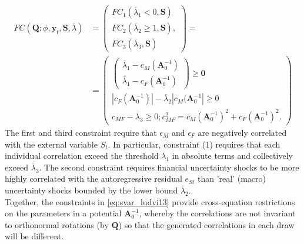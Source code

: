 \documentclass[a4paper,11pt,listof=nochaptergap,oneside,pointednumbers,bibtotoc,bigheadings,liststotoc]{scrbook}
\theoremstyle{mysatz}
\theoremstyle{mydefinition}
\theoremstyle{mybemerkung}
\newcommand{\vect}[1]{\boldsymbol{\mathbf{#1}}}
\begin{document}
\begin{equation} \label{eq:svar_ludvi13}
\begin{split}
	FC(\vect{Q}; \phi, \vect{y}_t, \vect{S}, \overline{\lambda}) & = \begin{pmatrix}
	FC_1(\overline{\lambda}_1 < 0, \vect{S})\\
	 FC_2(\overline{\lambda}_2 \geq 1, \vect{S}), \\
	 FC_3(\overline{\lambda}_3, \vect{S})
	\end{pmatrix} = \\
	& = \begin{pmatrix}
	 		\begin{pmatrix}
	 			\overline{\lambda}_1 - c_M(\vect{A}_0^{-1})\\
				\overline{\lambda}_1 - c_F(\vect{A}_0^{-1})
			\end{pmatrix} \geq \vect{0} \\
			|c_F(\vect{A}_0^{-1})| - \overline{\lambda}_2|c_M(\vect{A}_0^{-1}| \geq 0 \\
			c_{MF} - \overline{\lambda}_3 \geq 0; c_{MF}^2 = c_M(\vect{A}_0^{-1})^2 + c_F(\vect{A}_0^{-1})^2.
	\end{pmatrix} 
\end{split}								
\end{equation}
The first and third constraint require that $\epsilon_M$ and $\epsilon_F$ are negatively correlated with the external variable $S_t$. In particular, constraint (1) requires that each individual correlation exceed the threshold $\overline{\lambda}_1$ in absolute terms and collectively exceed $\overline{\lambda}_3$. The second constraint requires financial uncertainty shocks to be more highly correlated with the autoregressive residual $e_{St}$ than 'real' (macro) uncertainty shocks bounded by the lower bound $\overline{\lambda}_2$.\\
Together, the constraints in \ref{eq:svar_ludvi13} provide cross-equation restrictions on the parameters in a potential $\vect{A}_0^{-1}$, whereby the correlations are not invariant to orthonormal rotations (by $\vect{Q}$) so that the generated correlations in each draw will be different.
\end{document}
